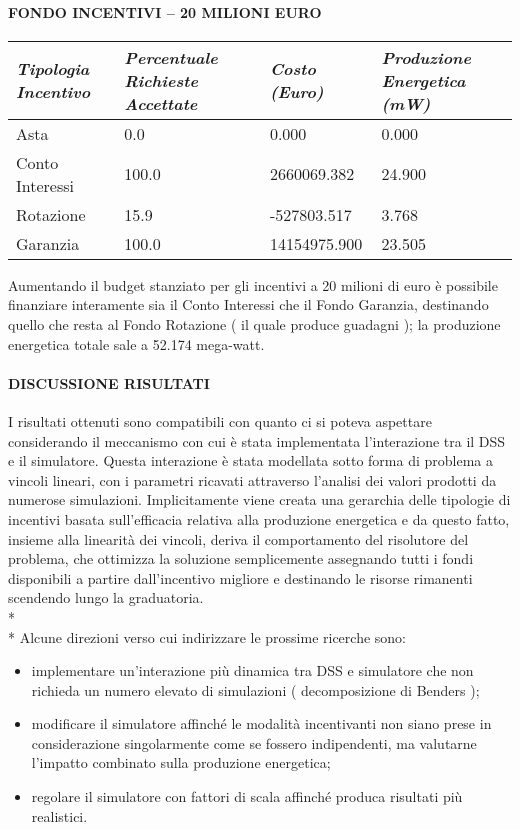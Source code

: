 \documentclass[12pt,a4paper,openright,twoside]{report}
\begin{document}
\paragraph{FONDO INCENTIVI – 20 MILIONI EURO}
\begin{center}
	\begin{tabular}{ | p{3.5cm} | p{3.5cm} | p{3.5cm} | p{3.5cm} | }
		\hline
		\nohyphens{\emph{Tipologia Incentivo}} & \nohyphens{\emph{Percentuale Richieste Accettate}} & \nohyphens{\emph{Costo (Euro)}} & \nohyphens{\emph{Produzione Energetica (mW)}} \\ \hline 
		Asta & 0.0 & 0.000 & 0.000 \\ \hline
		Conto Interessi & 100.0 & 2660069.382 & 24.900 \\ \hline
		Rotazione & 15.9 & -527803.517 & 3.768 \\ \hline
		Garanzia & 100.0 & 14154975.900 & 23.505 \\
		\hline
	\end{tabular}
\end{center}
Aumentando il budget stanziato per gli incentivi a 20 milioni di euro è possibile finanziare interamente sia il Conto Interessi che il Fondo Garanzia, destinando quello che resta al Fondo Rotazione ( il quale produce guadagni ); la produzione energetica totale sale a 52.174 mega-watt.
\paragraph{DISCUSSIONE RISULTATI}
I risultati ottenuti sono compatibili con quanto ci si poteva aspettare considerando  il meccanismo con cui è stata implementata l'interazione tra il DSS e il simulatore. Questa interazione è stata modellata sotto forma di problema a vincoli lineari, con i parametri ricavati attraverso l'analisi dei valori prodotti da numerose simulazioni. 
Implicitamente viene creata una gerarchia delle tipologie di incentivi basata sull'efficacia relativa alla produzione energetica e da questo fatto, insieme alla linearità dei vincoli, deriva il comportamento del risolutore del problema, che ottimizza la soluzione semplicemente assegnando tutti i fondi disponibili a partire dall'incentivo migliore e destinando le risorse rimanenti scendendo lungo la graduatoria. 
\\* \\*
Alcune direzioni verso cui indirizzare le prossime ricerche sono:
\begin{itemize}
	\item implementare un'interazione più dinamica tra DSS e simulatore che non richieda un numero elevato di simulazioni ( decomposizione di Benders );
	\item modificare il simulatore affinché le modalità incentivanti non siano prese in considerazione singolarmente come se fossero indipendenti, ma valutarne l'impatto combinato sulla produzione energetica;
	\item regolare il simulatore con fattori di scala affinché produca risultati più realistici.
\end{itemize}
\end{document}
